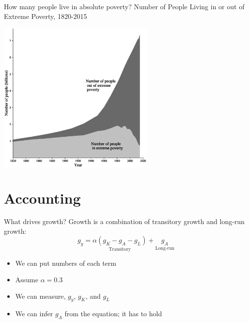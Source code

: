 \begin{frame}{How many people live in absolute poverty?}
Number of People Living in or out of Extreme Poverty, 1820-2015
\begin{center}
\includegraphics[height = 3in]{../Figures/fig-ch3-fig12.eps}
\end{center}
\end{frame}

\section{Accounting}
\begin{frame}{What drives growth?}
Growth is a combination of transitory growth and long-run growth:
\begin{equation}
	g_y = \underset{\text{Transitory}}{\alpha (g_K - g_A - g_L)} + \underset{\text{Long-run}}{g_A} \label{EQ_gy} \nonumber
\end{equation}
\begin{itemize}
	\item We can put numbers of each term
	\item Assume $\alpha = 0.3$
	\item We can measure, $g_y$, $g_K$, and $g_L$
	\item We can infer $g_A$ from the equation; it has to hold
\end{itemize}
\end{frame}

